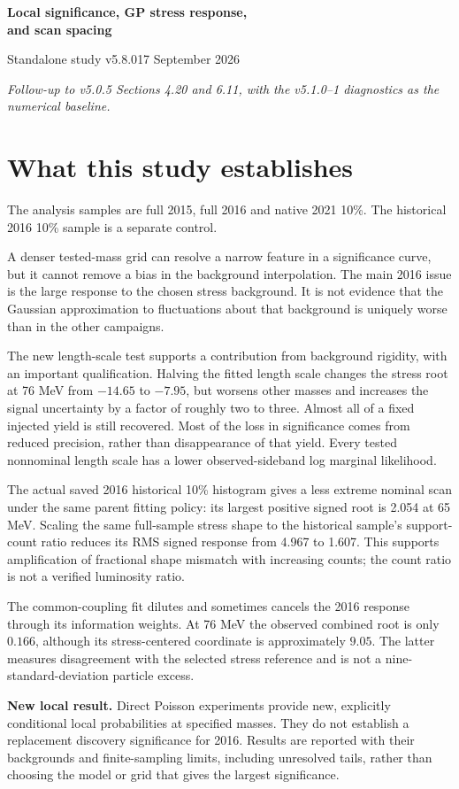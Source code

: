 \documentclass[11pt]{article}
\newcommand{\pageheading}[1]{\section*{\color{navy}#1}}
\begin{document}
{\LARGE\bfseries\color{navy} Local significance, GP stress response,\\and scan spacing}\par
{\large Standalone study v5.8.0}\hfill 17 September 2026\par
\textit{Follow-up to v5.0.5 Sections 4.20 and 6.11, with the v5.1.0--1 diagnostics as the numerical baseline.}

\pageheading{What this study establishes}
The analysis samples are full 2015, full 2016 and native 2021 10\%. The historical 2016 10\% sample is a separate control.

A denser tested-mass grid can resolve a narrow feature in a significance curve, but it cannot remove a bias in the background interpolation. The main 2016 issue is the large response to the chosen stress background. It is not evidence that the Gaussian approximation to fluctuations about that background is uniquely worse than in the other campaigns.



The new length-scale test supports a contribution from background rigidity, with an important qualification. Halving the fitted length scale changes the stress root at 76 MeV from $-14.65$ to $-7.95$, but worsens other masses and increases the signal uncertainty by a factor of roughly two to three. Almost all of a fixed injected yield is still recovered. Most of the loss in significance comes from reduced precision, rather than disappearance of that yield. Every tested nonnominal length scale has a lower observed-sideband log marginal likelihood.

The actual saved 2016 historical 10\% histogram gives a less extreme nominal scan under the same parent fitting policy: its largest positive signed root is 2.054 at 65 MeV. Scaling the same full-sample stress shape to the historical sample's support-count ratio reduces its RMS signed response from 4.967 to 1.607. This supports amplification of fractional shape mismatch with increasing counts; the count ratio is not a verified luminosity ratio.

The common-coupling fit dilutes and sometimes cancels the 2016 response through its information weights. At 76 MeV the observed combined root is only $0.166$, although its stress-centered coordinate is approximately $9.05$. The latter measures disagreement with the selected stress reference and is not a nine-standard-deviation particle excess.

\textbf{New local result.} Direct Poisson experiments provide new, explicitly conditional local probabilities at specified masses. They do not establish a replacement discovery significance for 2016. Results are reported with their backgrounds and finite-sampling limits, including unresolved tails, rather than choosing the model or grid that gives the largest significance.
\end{document}
